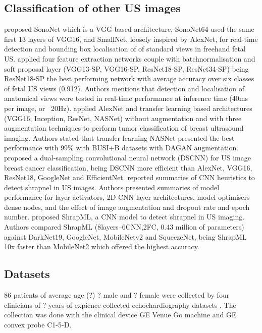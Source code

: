 \documentclass[mlabstract,twocolumn]{jmlr}
\begin{document}
\subsection{Classification of other US images}
\citet{baumgartner2017-IEEETransMedImag} proposed SonoNet which is a VGG-based architecture, SonoNet64 used the same first 13 layers of VGG16,
and SmallNet, loosely inspired by AlexNet, for real-time detection and bounding box localisation of of standard views in freehand fetal US.
\citet{toussaint2018-MICCAI}
applied four feature extraction networks couple with batchnormalisation and soft proposal layer (VGG13-SP, VGG16-SP, ResNet18-SP, ResNet34-SP) being ResNet18-SP the best performing network with average accuracy over six classes of fetal US views (0.912).
Authors mentions that detection and localisation of anatomical views were tested in real-time performance at inference time (40ms per image, or ~20Hz).
\citet{Al-Dhabyani2019-IJACSA} applied AlexNet and transfer learning based architectures (VGG16, Inception, ResNet, NASNet) without augmentation and with three augmentation techniques to perform tumor classification of breast ultrasound imaging. Authors stated that transfer learning NASNet presented the best performance with 99\% with BUSI+B datasets with DAGAN augmentation.
\citet{xie2020-physics-in-medicine-biology} proposed a dual-sampling convolutional neural network (DSCNN) for US image breast cancer classification, being DSCNN more efficient than AlexNet, VGG16, ResNet18, GoogleNet and EfficientNet.
\citet{snider2022-ScientificReports} reported summaries of CNN heuristics to detect shrapnel in US images.
Authors presented summaries of model performance for layer activators, 2D CNN layer architectures, model optimisers dense nodes, and the effect of image augmentation and dropout rate and epoch number.
\citet{boice2022-in-jimaging} proposed ShrapML, a CNN model to detect shrapnel in US imaging.
Authors compared ShrapML (8layers--6CNN,2FC, 0.43 million of parameters) against DarkNet19, GoogleNet, MobileNetv2 and SqueezeNet, being ShrapML 10x faster than MobileNet2 which offered the highest accuracy.




\subsection{Datasets}
86 patients of average age (?) ? male and ? female were collected by four clinicians of ? years of expience collected echochardiography datasets .
The collection was done with the clinical device GE Venue Go machine and GE convex probe C1-5-D.
\end{document}
